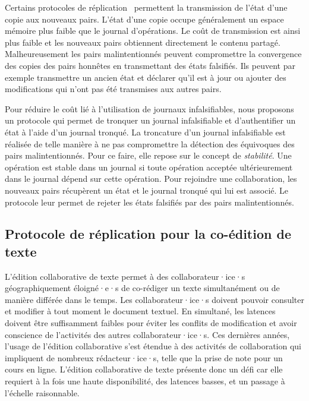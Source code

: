 Certains protocoles de réplication~\autocite{feldman2010sporc,almeida_2018_delta-crdt-revisited} permettent la transmission de l'état d'une copie aux nouveaux pairs.
L'état d'une copie occupe généralement un espace mémoire plus faible que le journal d'opérations.
Le coût de transmission est ainsi plus faible et les nouveaux pairs obtiennent directement le contenu partagé.
Malheureusement les pairs malintentionnés peuvent compromettre la convergence des copies des pairs honnêtes en transmettant des états falsifiés.
Ils peuvent par exemple transmettre un ancien état et déclarer qu'il est à jour ou ajouter des modifications qui n'ont pas été transmises aux autres pairs.

Pour réduire le coût lié à l'utilisation de journaux infalsifiables, nous proposons un protocole qui permet de tronquer un journal infalsifiable et d'authentifier un état à l'aide d'un journal tronqué.
La troncature d'un journal infalsifiable est réalisée de telle manière à ne pas compromettre la détection des équivoques des pairs malintentionnés.
Pour ce faire, elle repose sur le concept de \emph{stabilité}.
Une opération est stable dans un journal si toute opération acceptée ultérieurement dans le journal dépend sur cette opération.
Pour rejoindre une collaboration, les nouveaux pairs récupèrent un état et le journal tronqué qui lui est associé.
Le protocole leur permet de rejeter les états falsifiés par des pairs malintentionnés.


\subsection{Protocole de réplication pour la co-édition de texte}


L'édition collaborative de texte permet à des collaborateur·ice·s géographiquement éloigné·e·s de co-rédiger un texte simultanément ou de manière différée dans le temps.
Les collaborateur·ice·s doivent pouvoir consulter et modifier à tout moment le document textuel.
En simultané, les latences doivent être suffisamment faibles pour éviter les conflits de modification et avoir conscience de l'activités des autres collaborateur·ice·s.
Ces dernières années, l'usage de l'édition collaborative s'est étendue à des activités de collaboration qui impliquent de nombreux rédacteur·ice·s, telle que la prise de note pour un cours en ligne.
L'édition collaborative de texte présente donc un défi car elle requiert à la fois une haute disponibilité, des latences basses, et un passage à l'échelle raisonnable.

